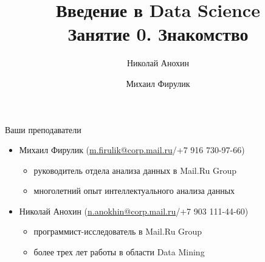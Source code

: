 \documentclass[10pt,a4paper]{beamer}
\author{Николай Анохин \and Михаил Фирулик}
\title{Введение в Data Science \\ Занятие 0. Знакомство}
\begin{document}
\maketitle


\begin{frame}{Ваши преподаватели}

\begin{itemize}

	\item Михаил Фирулик (\href{mailto:m.firulik@corp.mail.ru}{m.firulik@corp.mail.ru}\;/\;+7 916 730-97-66) \\
	\begin{itemize}
		\item руководитель отдела анализа данных в Mail.Ru Group \\
		\item многолетний опыт интеллектуального анализа данных		
	\end{itemize}

	\item Николай Анохин (\href{mailto:n.anokhin@corp.mail.ru}{n.anokhin@corp.mail.ru}\;/\;+7 903 111-44-60)\\	
	\begin{itemize}
		\item программист-исследователь в Mail.Ru Group \\
		\item более трех лет работы в области Data Mining
	\end{itemize}

\end{itemize}

\end{frame}

\end{document}
